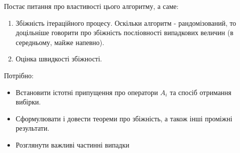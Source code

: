 \documentclass[main.tex]{subfile}
\begin{document}
	Постає питання про властивості цього алгоритму, а саме:
	\begin{enumerate}
		\item Збіжність ітераційного процесу. Оскільки алгоритм - рандомізований, то доцільніше говорити про збіжність посліовності випадкових величин (в середньому, майже напевно). 
		\item Оцінка швидкості збіжності.
	\end{enumerate}
    
	Потрібно:
	\begin{itemize}
		\item Встановити істотні припущення про оператори $A_i$ та спосіб отримання вибірки.
		\item Сформулювати і довести теореми про збіжність, а також інші проміжні результати.
		\item Розглянути важливі частинні випадки
	\end{itemize}
\end{document}
